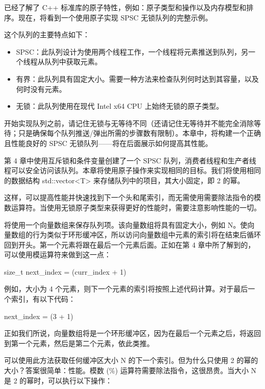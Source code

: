 
已经了解了 C++ 标准库的原子特性，例如：原子类型和操作以及内存模型和排序。现在，将看到一个使用原子实现 SPSC 无锁队列的完整示例。

这个队列的主要特点如下：

\begin{itemize}
\item
SPSC：此队列设计为使用两个线程工作，一个线程将元素推送到队列，另一个线程从队列中获取元素。

\item
有界：此队列具有固定大小。需要一种方法来检查队列何时达到其容量，以及何时没有元素。

\item
无锁：此队列使用在现代 Intel x64 CPU 上始终无锁的原子类型。
\end{itemize}

开始实现队列之前，请记住无锁与无等待不同（还请记住无等待并不能完全消除等待；只是确保每个队列推送/弹出所需的步骤数有限制）。本章中，将构建一个正确且性能良好的 SPSC 无锁队列——将在后面展示如何提高其性能。

第 4 章中使用互斥锁和条件变量创建了一个 SPSC 队列，消费者线程和生产者线程可以安全访问该队列。本章将使用原子操作来实现相同的目标。我们将使用相同的数据结构 std::vector<T> 来存储队列中的项目，其大小固定，即 2 的幂。

这样，可以提高性能并快速找到下一个头和尾索引，而无需使用需要除法指令的模数运算符。当使用无锁原子类型来获得更好的性能时，需要注意影响性能的一切。


将使用一个向量数组来保存队列项。该向量数组将具有固定大小，例如 N。使向量数组的行为类似于环形缓冲区，所以访问向量数组中元素的索引将在结束后循环回到开头。第一个元素将跟在最后一个元素后面。正如在第 4 章中所了解到的，可以使用模运算符来做到这一点：

\begin{cpp}
size_t next_index = (curr_index + 1) %
\end{cpp}

例如，大小为 4 个元素，则下一个元素的索引将按照上述代码计算。对于最后一个索引，有以下代码：

\begin{cpp}
next_index = (3 + 1) %
\end{cpp}

正如我们所说，向量数组将是一个环形缓冲区，因为在最后一个元素之后，将返回到第一个元素，然后是第二个元素，依此类推。

可以使用此方法获取任何缓冲区大小 N 的下一个索引。但为什么只使用 2 的幂的大小？答案很简单：性能。模数 (\%) 运算符需要除法指令，这很昂贵。当大小 N 是 2 的幂时，可以执行以下操作：

